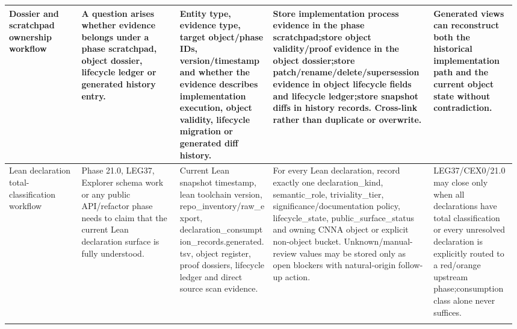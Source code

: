 \begin{longtable}{L{0.14\linewidth} L{0.19\linewidth} L{0.18\linewidth} L{0.31\linewidth} L{0.16\linewidth}}
\hline
\addlinespace[0.24em]
Dossier and scratchpad ownership workflow & A question arises whether evidence belongs under a phase scratchpad, object dossier, lifecycle ledger or generated history entry. & Entity type, evidence type, target object/\allowbreak{}phase IDs, version/\allowbreak{}timestamp and whether the evidence describes implementation execution, object validity, lifecycle migration or generated diff history. & Store implementation process evidence in the phase scratchpad;\newline store object validity/\allowbreak{}proof evidence in the object dossier;\newline store patch/\allowbreak{}rename/\allowbreak{}delete/\allowbreak{}supersession evidence in object lifecycle fields and lifecycle ledger;\newline store snapshot diffs in history records. Cross-link rather than duplicate or overwrite. & Generated views can reconstruct both the historical implementation path and the current object state without contradiction.\\
\hline
\addlinespace[0.24em]
Lean declaration total-classification workflow & Phase 21.0, LEG37, Explorer schema work or any public API/\allowbreak{}refactor phase needs to claim that the current Lean declaration surface is fully understood. & Current Lean snapshot timestamp, lean toolchain version, repo\_inventory/\allowbreak{}raw\_export, declaration\_consumption\_records.generated.tsv, object register, proof dossiers, lifecycle ledger and direct source scan evidence. & For every Lean declaration, record exactly one declaration\_kind, semantic\_role, triviality\_tier, significance/\allowbreak{}documentation policy, lifecycle\_state, public\_surface\_status and owning CNNA object or explicit non-object bucket. Unknown/\allowbreak{}manual-review values may be stored only as open blockers with natural-origin follow-up action. & LEG37/\allowbreak{}CEX0/\allowbreak{}21.0 may close only when all declarations have total classification or every unresolved declaration is explicitly routed to a red/\allowbreak{}orange upstream phase;\newline consumption class alone never suffices.\\
\hline
\addlinespace[0.24em]

\end{longtable}
